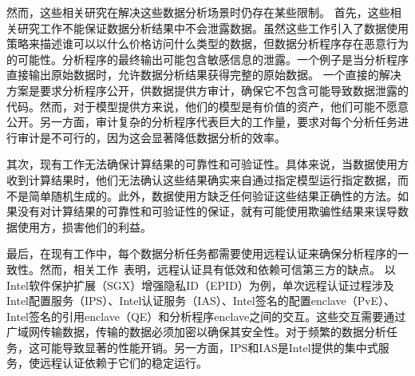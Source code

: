 然而，这些相关研究在解决这些数据分析场景时仍存在某些限制。
首先，这些相关研究工作不能保证数据分析结果中不会泄露数据。虽然这些工作引入了数据使用策略来描述谁可以以什么价格访问什么类型的数据，但数据分析程序存在恶意行为的可能性。分析程序的最终输出可能包含敏感信息的泄露。一个例子是当分析程序直接输出原始数据时，允许数据分析结果获得完整的原始数据。
一个直接的解决方案是要求分析程序公开，供数据提供方审计，确保它不包含可能导致数据泄露的代码。然而，对于模型提供方来说，他们的模型是有价值的资产，他们可能不愿意公开。另一方面，审计复杂的分析程序代表巨大的工作量，要求对每个分析任务进行审计是不可行的，因为这会显著降低数据分析的效率。

其次，现有工作无法确保计算结果的可靠性和可验证性。具体来说，当数据使用方收到计算结果时，他们无法确认这些结果确实来自通过指定模型运行指定数据，而不是简单随机生成的。此外，数据使用方缺乏任何验证这些结果正确性的方法。如果没有对计算结果的可靠性和可验证性的保证，就有可能使用欺骗性结果来误导数据使用方，损害他们的利益。

最后，在现有工作中，每个数据分析任务都需要使用远程认证来确保分析程序的一致性。然而，相关工作~\cite{chen2019opera,chen2022mage}表明，远程认证具有低效和依赖可信第三方的缺点。
以Intel软件保护扩展（SGX）增强隐私ID（EPID）为例，单次远程认证过程涉及Intel配置服务（IPS）、Intel认证服务（IAS）、Intel签名的配置enclave（PvE）、Intel签名的引用enclave（QE）和分析程序enclave之间的交互。这些交互需要通过广域网传输数据，传输的数据必须加密以确保其安全性。对于频繁的数据分析任务，这可能导致显著的性能开销。另一方面，IPS和IAS是Intel提供的集中式服务，使远程认证依赖于它们的稳定运行。

